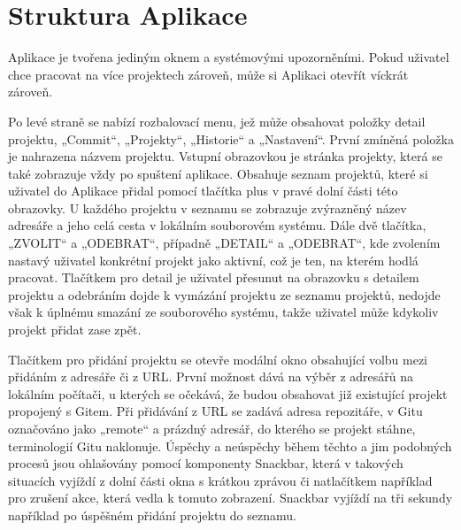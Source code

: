 \section{Struktura Aplikace}

Aplikace je tvořena jediným oknem a systémovými upozorněními. Pokud uživatel chce pracovat na více projektech zároveň, může si Aplikaci otevřít víckrát zároveň.

Po levé straně se nabízí rozbalovací menu, jež může obsahovat položky detail projektu, „Commit“, „Projekty“, „Historie“ a „Nastavení“. První zmíněná položka je nahrazena názvem projektu. Vstupní obrazovkou je stránka projekty, která se také zobrazuje vždy po spuštení aplikace. Obsahuje seznam projektů, které si uživatel do Aplikace přidal pomocí tlačítka plus v pravé dolní části této obrazovky. U každého projektu v seznamu se zobrazuje zvýrazněný název adresáře a jeho celá cesta v lokálním souborovém systému. Dále dvě tlačítka, „ZVOLIT“ a „ODEBRAT“, případně „DETAIL“ a „ODEBRAT“, kde zvolením nastavý uživatel konkrétní projekt jako aktivní, což je ten, na kterém hodlá pracovat. Tlačítkem pro detail je uživatel přesunut na obrazovku s detailem projektu a odebráním dojde k vymázání projektu ze seznamu projektů, nedojde však k úplnému smazání ze souborového systému, takže uživatel může kdykoliv projekt přidat zase zpět.

Tlačítkem pro přidání projektu se otevře modální okno obsahující volbu mezi přidáním z adresáře či z URL. První možnost dává na výběr z adresářů na lokálním počítači, u kterých se očekává, že budou obsahovat již existující projekt propojený s Gitem. Při přidávání z URL se zadává adresa repozitáře, v Gitu označováno jako „remote“ a prázdný adresář, do kterého se projekt stáhne, terminologií Gitu naklonuje. Úspěchy a neúspěchy během těchto a jim podobných procesů jsou ohlašovány pomocí komponenty Snackbar, která v takových situacích vyjíždí z dolní části okna s krátkou zprávou či natlačítkem například pro zrušení akce, která vedla k tomuto zobrazení. Snackbar vyjíždí na tři sekundy například po úspěšném přidání projektu do seznamu.

